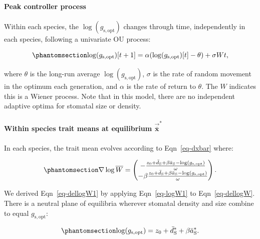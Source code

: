 \documentclass[
  letterpaper,
  DIV=11,
  numbers=noendperiod]{scrartcl}
\let\oldparagraph\paragraph
\renewcommand{\paragraph}[1]{\oldparagraph{#1}\mbox{}}
\begin{document}
\paragraph{Peak controller process}\label{sec-peak-controller1}

Within each species, the \(\log (g_\mathrm{s,opt})\) changes through
time, independently in each species, following a univariate OU process:

\begin{equation}\phantomsection\label{eq-ou1}{\log (g_\mathrm{s,opt})[t+1] = \alpha (\log (g_\mathrm{s,opt})[t] - \theta) + \sigma Wt,}\end{equation}

where \(\theta\) is the long-run average \(\log (g_\mathrm{s,opt})\),
\(\sigma\) is the rate of random movement in the optimum each
generation, and \(\alpha\) is the rate of return to \(\theta\). The
\(W\) indicates this is a Wiener process. Note that in this model, there
are no independent adaptive optima for stomatal size or density.

\paragraph{\texorpdfstring{Within species trait means at equilibrium
\(\vec{\bar{\mathbf{x}}}^*\)}{Within species trait means at equilibrium \textbackslash vec\{\textbackslash bar\{\textbackslash mathbf\{x\}\}\}\^{}*}}\label{within-species-trait-means-at-equilibrium-vecbarmathbfx}

In each species, the trait mean evolves according to Eqn~\ref{eq-dxbar}
where:

\begin{equation}\phantomsection\label{eq-dellogW1}{\nabla \log \overline{W} = \begin{pmatrix} -\frac{z_0 + \bar{d}_\mathrm{S} + \beta \bar{a}_\mathrm{S} - \log(g_\mathrm{s,opt})}{\omega} \\ - \beta \frac{z_0 + \bar{d}_\mathrm{S} + \beta \bar{a}_\mathrm{S} - \log (g_\mathrm{s,opt})}{\omega} \end{pmatrix}.}\end{equation}

We derived Eqn~\ref{eq-dellogW1} by applying Eqn~\ref{eq-logW1} to
Eqn~\ref{eq-dellogW}. There is a neutral plane of equilibria wherever
stomatal density and size combine to equal \(g_\mathrm{s,opt}\):

\begin{equation}\phantomsection\label{eq-xstar1}{\log (g_\mathrm{s,opt}) = z_0 + \bar{d}^*_\mathrm{S} + \beta \bar{a}^*_\mathrm{S}.}\end{equation}
\end{document}
